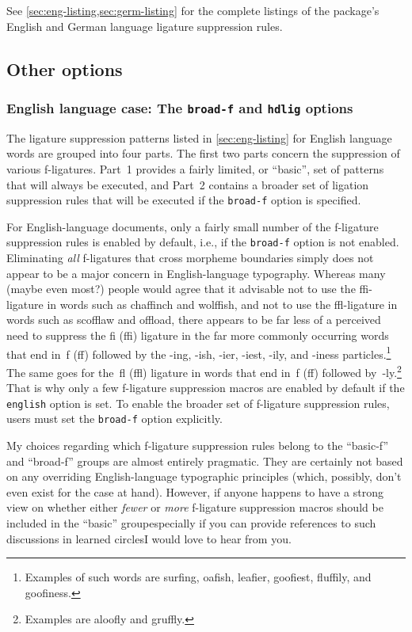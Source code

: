 \documentclass[12pt]{article}
\newcommand{\opt}[1]{\texttt{#1}}
\begin{document}
See \cref{sec:eng-listing,sec:germ-listing} for the complete listings of the package's English and German language ligature suppression rules.



\subsection{Other options}

\subsubsection[English language case: The broad-f and hdlig options]{English language case: The \opt{broad-f} and \opt{hdlig} options} \label{sec:eng-opt}

The ligature suppression patterns listed in \cref{sec:eng-listing} for English language words are grouped into four parts. The first two parts concern the suppression of various f-ligatures. Part~1 provides a fairly limited, or \enquote{basic}, set of patterns that will always be executed, and Part~2 contains a broader set of ligation suppression rules that will be executed if the \opt{broad-f} option is specified. 

For English-language documents, only a fairly small number of the f-ligature suppression rules is enabled by default, i.e., if the \opt{broad-f} option is not enabled. Eliminating \emph{all} f-ligatures that cross morpheme boundaries simply does not appear to be a major concern in English-language typography. Whereas many (maybe even most?) people would agree that it advisable not to use the ffi-ligature in words such as chaffinch and wolffish, and not to use the ffl-ligature in words such as scofflaw and offload, there appears to be far less of a perceived need to suppress the fi (ffi) ligature in the far more commonly occurring words that end in~f (ff) followed by the -ing, -ish, -ier, -iest, -ily, and -iness particles.\footnote{Examples of such words are sur\mbox{fi}ng, oa\mbox{fi}sh, lea\mbox{fi}er, goo\mbox{fi}est, flu\mbox{ffi}ly, and goo\mbox{fi}ness.} The same goes for the~fl (ffl) ligature in words that end in~f (ff) followed by~-ly.\footnote{Examples are \mbox{aloofly} and \mbox{gruffly}.} That is why only a few f-ligature suppression macros are enabled by default if the \opt{english} option is set. To enable the broader set of f-ligature suppression rules, users must set the \opt{broad-f} option explicitly.

My choices regarding which f-ligature suppression rules belong to the \enquote{basic-f} and \enquote{broad-f} groups are almost entirely pragmatic. They are certainly not based on any overriding English-language typographic principles (which, possibly, don't even exist for the case at hand). However, if anyone happens to have a strong view on whether either \emph{fewer} or \emph{more} f-ligature suppression macros should be included in the \enquote{basic} group\textemdash especially if you can provide references to such discussions in learned circles\textemdash I would love to hear from you.
\end{document}
